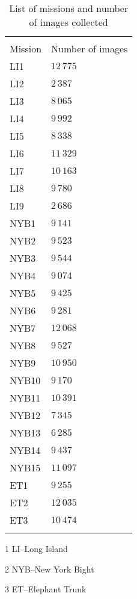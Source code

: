 \begin{table}
\centering
\begin{threeparttable}
      \begin{tabular}{ll}
      \toprule[1pt]\\[-6pt]
      Mission  & Number of images\\[2pt]\midrule
      LI1\tnote{1}	&$12\,775$\\
      LI2	&$2\,387$\\
      LI3	&$8\,065$\\
      LI4	&$9\,992$\\
      LI5	&$8\,338$\\
      LI6	&$11\,329$\\
      LI7	&$10\,163$\\
      LI8	&$9\,780$\\
      LI9	&$2\,686$\\
      NYB1\tnote{2}	&$9\,141$\\
      NYB2	&$9\,523$\\
      NYB3	&$9\,544$\\
      NYB4	&$9\,074$\\
      NYB5	&$9\,425$\\
      NYB6	&$9\,281$\\
      NYB7	&$12\,068$\\
      NYB8	&$9\,527$\\
      NYB9	&$10\,950$\\
      NYB10	&$9\,170$\\
      NYB11	&$10\,391$\\
      NYB12	&$7\,345$\\
      NYB13	&$6\,285$\\
      NYB14	&$9\,437$\\
      NYB15	&$11\,097$\\
      ET1\tnote{3}	&$9\,255$\\
      ET2	&$12\,035$\\
      ET3	&$10\,474$\\
      \\[2pt]\bottomrule[1pt]
    \end{tabular}
    \begin{tablenotes}
       \vskip 5pt
	  \item[1] \footnotesize{LI--Long Island}
	  \item[2] \footnotesize{NYB--New York Bight}
	  \item[3] \footnotesize{ET--Elephant Trunk}
      \end{tablenotes}                                                      
 \end{threeparttable}
  \caption{List of missions and number of images collected}
  \label{tab:mission_list}
\end{table}

